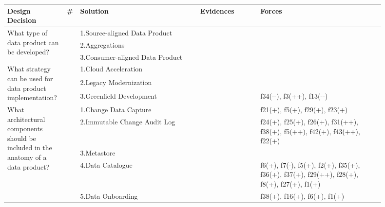 \begin{tabular}{|p{0.12\linewidth}|p{0.015\linewidth}|p{0.3\linewidth}|p{0.15\linewidth}|p{0.31\linewidth}|}
\hline
{\bf Design Decision} & {\bf \#} & {\bf Solution} & {\bf Evidences} & {\bf Forces}\\
\hline
\multirow{3}{\linewidth}{What type of data product can be developed?} &\cellcolor{emerald_shape_4}{} &1.Source-aligned Data Product&\cellcolor{emerald_shape_1}{} & \\
 & \cellcolor{emerald_shape_4}{} & 2.Aggregations&\cellcolor{emerald_shape_2}{i5} & \\
 & \multirow{-3}{\linewidth}{ \cellcolor{emerald_shape_4}{16}} &3.Consumer-aligned Data Product&\cellcolor{emerald_shape_1}{} & \\
\multirow{3}{\linewidth}{What strategy can be used for data product implementation?} &\cellcolor{emerald_shape_6}{} &1.Cloud Acceleration&\cellcolor{emerald_shape_1}{} & \\
 & \cellcolor{emerald_shape_6}{} & 2.Legacy Modernization&\cellcolor{emerald_shape_1}{} & \\
 & \multirow{-3}{\linewidth}{ \cellcolor{emerald_shape_6}{40}} &3.Greenfield Development&\cellcolor{emerald_shape_7}{s1, s2, s3, s5, s6, s7, s8, s9, s11, s14, s15, s18, s20, s23, s25, s28, s30, s31, s32, s33, s35, s37, s38, s39, s40, s41, s42, s43, s45, s49, i1, i2, i3} & f34(-{}-), f3(++), f13(-{}-)\\
\multirow{8}{\linewidth}{What architectural components should be included in the anatomy of a data product?} &\cellcolor{emerald_shape_6}{} &1.Change Data Capture&\cellcolor{emerald_shape_4}{s4, s17, s20, s38, s45, s48, s53, s54, s55, s56, i2, i3} & f21(+), f5(+), f29(+), f23(+)\\
 & \cellcolor{emerald_shape_6}{} & 2.Immutable Change Audit Log&\cellcolor{emerald_shape_5}{s4, s8, s12, s31, s32, s35, s36, s45, s47, s48, s53, s54, s55, s56, s57, i1, i2, i3, i4} & f24(+), f25(+), f26(+), f31(++), f38(+), f5(++), f42(+), f43(++), f22(+)\\
 & \cellcolor{emerald_shape_6}{} & 3.Metastore&\cellcolor{emerald_shape_2}{i1, i4, i5, i6} & \\
 & \cellcolor{emerald_shape_6}{} & 4.Data Catalogue&\cellcolor{emerald_shape_6}{s1, s3, s5, s7, s9, s15, s16, s25, s30, s31, s32, s37, s43, s47, s48, s53, s55, i1, i3, i4, i5, i6} & f6(+), f7(-), f5(+), f2(+), f35(+), f36(+), f37(+), f29(++), f28(+), f8(+), f27(+), f1(+)\\
 & \cellcolor{emerald_shape_6}{} & 5.Data Onboarding&\cellcolor{emerald_shape_3}{s4, s5, s15, s30, s52, i1, i3} & f38(+), f16(+), f6(+), f1(+)\\

\end{tabular}
